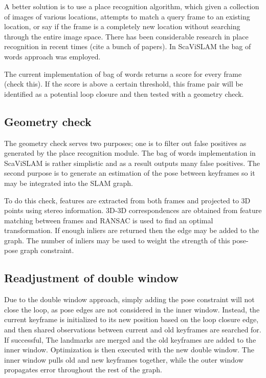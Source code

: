 A better solution is to use a place recognition algorithm, which given a collection of images of various locations, attempts to match a query frame to an existing location, or say if the frame is a completely new location without searching through the entire image space.  There has been considerable research in place recognition in recent times (cite a bunch of papers).  In ScaViSLAM the bag of words approach was employed.


The current implementation of bag of words returns a score for every frame (check this).  If the score is above a certain threshold, this frame pair will be identified as a potential loop closure and then tested with a geometry check.

\subsection{Geometry check}

The geometry check serves two purposes; one is to filter out false positives as generated by the place recognition module.  The bag of words implementation in ScaViSLAM is rather simplistic and as a result outputs many false positives.  The second purpose is to generate an estimation of the pose between keyframes so it may be integrated into the SLAM graph.  

To do this check, features are extracted from both frames and projected to 3D points using stereo information.  3D-3D correspondences are obtained from feature matching between frames and RANSAC is used to find an optimal transformation.  If enough inliers are returned then the edge may be added to the graph.  The number of inliers may be used to weight the strength of this pose-pose graph constraint.

\subsection{Readjustment of double window}
Due to the double window approach, simply adding the pose constraint will not close the loop, as pose edges are not considered in the inner window.  Instead, the current keyframe is initialized to its new position based on the loop closure edge, and then shared observations between current and old keyframes are searched for.  If successful, The landmarks are merged and the old keyframes are added to the inner window.  Optimization is then executed with the new double window.  The inner window pulls old and new keyframes together, while the outer window propagates error throughout the rest of the graph.

